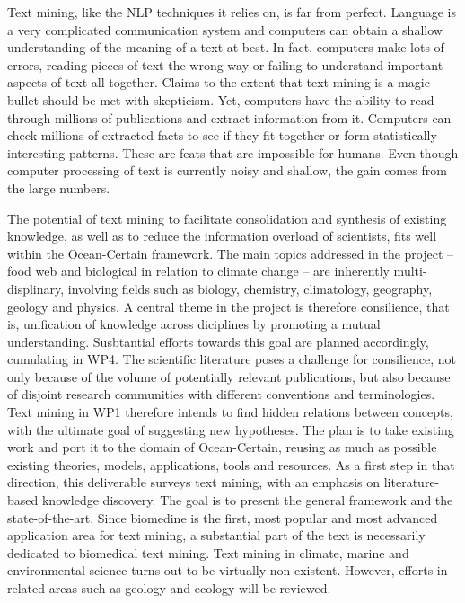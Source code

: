 Text mining, like the NLP techniques it relies on, is far from perfect.
Language is a very complicated communication system and computers can obtain a shallow understanding of the meaning of a text at best.
In fact, computers make lots of errors, reading pieces of text the wrong way or failing to understand important aspects of text all together.
Claims to the extent that text mining is a magic bullet should be met with skepticism. 
Yet, computers have the ability to read through millions of publications and extract information from it.
Computers can check millions of extracted facts to see if they fit together or form statistically interesting patterns.
These are feats that are impossible for humans.
Even though computer processing of text is currently noisy and shallow, the gain comes from the large numbers.

The potential of text mining to facilitate consolidation and synthesis of existing knowledge, as well as to reduce the information overload of scientists, fits well within the Ocean-Certain framework.
The main topics addressed in the project -- food web and biological in relation to climate change -- are inherently multi-displinary, involving fields such as biology, chemistry, climatology, geography, geology and physics.
A central theme in the project is therefore consilience, that is, unification of knowledge across diciplines by promoting a mutual understanding.
Susbtantial efforts towards this goal are planned accordingly, cumulating in WP4.
The scientific literature poses a challenge for consilience, not only because of the volume of potentially relevant publications, but also because of disjoint research communities with different conventions and terminologies.
Text mining in WP1 therefore intends to find hidden relations between concepts, with the ultimate goal of suggesting new hypotheses.
The plan is to take existing work and port it to the domain of Ocean-Certain, reusing as much as possible existing theories, models, applications, tools and resources.
As a first step in that direction, this deliverable surveys text mining, with an emphasis on literature-based knowledge discovery.
The goal is to present the general framework and the state-of-the-art.
Since biomedine is the first, most popular and most advanced application area for text mining, a substantial part of the text is necessarily dedicated to biomedical text mining.
Text mining in climate, marine and environmental science turns out to be virtually non-existent.
However, efforts in related areas such as geology and ecology will be reviewed.


  

 
  






